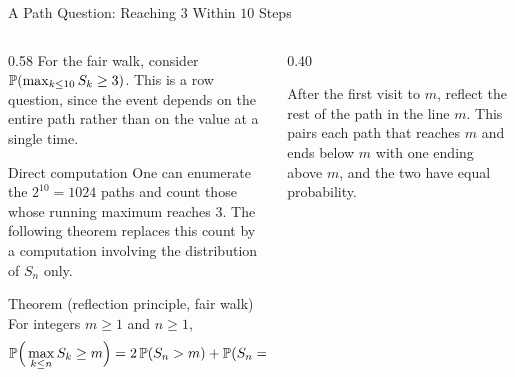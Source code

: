 \begin{frame}{A Path Question: Reaching $3$ Within $10$ Steps}
  \label{fr:reflect}
  \small
  \begin{columns}[T]
    \begin{column}{0.58\textwidth}
      For the fair walk, consider $\mathbb{P}(\max_{k\le10}S_k\ge3)$. This is a row question, since the event depends on the entire path rather than on the value at a single time.
      \begin{block}{Direct computation}
        One can enumerate the $2^{10}=1024$ paths and count those whose running maximum reaches $3$. The following theorem replaces this count by a computation involving the distribution of $S_n$ only.
      \end{block}
      \begin{block}{Theorem (reflection principle, fair walk)}
        For integers $m\ge1$ and $n\ge1$,
        \[
          \mathbb{P}\Big(\max_{k\le n}S_k\ge m\Big)=2\,\mathbb{P}(S_n>m)+\mathbb{P}(S_n=m).
        \]
      \end{block}
    \end{column}
    \begin{column}{0.40\textwidth}
      \centering
      \par\smallskip
      {\footnotesize After the first visit to $m$, reflect the rest of the path in the line $m$. This pairs each path that reaches $m$ and ends below $m$ with one ending above $m$, and the two have equal probability.}
    \end{column}
  \end{columns}
\end{frame}

